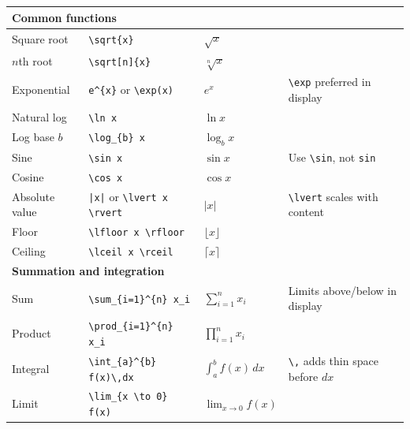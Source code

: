 \begin{longtable}{p{3.2cm} p{4.5cm} p{3.0cm} p{3.5cm}}
\multicolumn{4}{l}{\textbf{Common functions}} \\
\midrule
Square root & \verb|\sqrt{x}| & $\sqrt{x}$ & \\
$n$th root & \verb|\sqrt[n]{x}| & $\sqrt[n]{x}$ & \\
Exponential & \verb|e^{x}| or \verb|\exp(x)| & $e^{x}$ & \verb|\exp| preferred in display \\
Natural log & \verb|\ln x| & $\ln x$ & \\
Log base $b$ & \verb|\log_{b} x| & $\log_{b} x$ & \\
Sine & \verb|\sin x| & $\sin x$ & Use \verb|\sin|, not \texttt{sin} \\
Cosine & \verb|\cos x| & $\cos x$ & \\
Absolute value & \verb+|x|+ or \verb|\lvert x \rvert| & $\lvert x \rvert$ & \verb|\lvert| scales with content \\
Floor & \verb|\lfloor x \rfloor| & $\lfloor x \rfloor$ & \\
Ceiling & \verb|\lceil x \rceil| & $\lceil x \rceil$ & \\
\midrule

\multicolumn{4}{l}{\textbf{Summation and integration}} \\
\midrule
Sum & \verb|\sum_{i=1}^{n} x_i| & $\sum_{i=1}^{n} x_i$ & Limits above/below in display \\
Product & \verb|\prod_{i=1}^{n} x_i| & $\prod_{i=1}^{n} x_i$ & \\
Integral & \verb|\int_{a}^{b} f(x)\,dx| & $\int_{a}^{b} f(x)\,dx$ & \verb|\,| adds thin space before $dx$ \\
Limit & \verb|\lim_{x \to 0} f(x)| & $\lim_{x \to 0} f(x)$ & \\
\midrule


\end{longtable}
